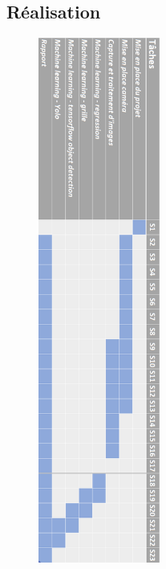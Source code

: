 \begin{appendix}
\chapter{Réalisation}
\begin{figure}[H]
    \includegraphics[width=4cm]{img/real.png}
    \centering
\end{figure} 

\end{appendix}
